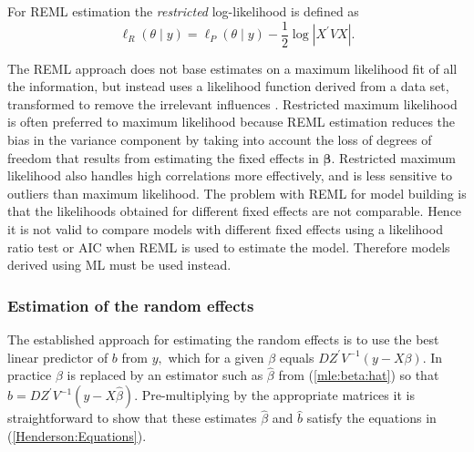 \documentclass[12pt, a4paper]{report}
\theoremstyle{plain}
\theoremstyle{definition}
\theoremstyle{remark}
\begin{document}
For REML estimation the \emph{restricted} log-likelihood is defined as
\[
\ell_R(\theta \mid y) =
\ell_P(\theta \mid y) -\frac{1}{2} \log |X^\prime VX |.
\]

The REML approach does not base estimates on a maximum likelihood fit of all the information, but instead uses a likelihood function derived from a data set, transformed to remove the irrelevant influences \citep{REMLDefine}.
Restricted maximum likelihood is often preferred to maximum likelihood because REML estimation reduces the bias in the variance component by taking into account the loss of degrees of freedom that results
from estimating the fixed effects in $\boldsymbol{\beta}$. Restricted maximum likelihood also handles high correlations more effectively, and is less sensitive to outliers than maximum likelihood.  The problem with REML for model building is that the likelihoods obtained for different fixed effects are not comparable. Hence it is not valid to compare models with different fixed effects using a likelihood ratio test or AIC when REML is used to
estimate the model. Therefore models derived using ML must be used instead.

\subsubsection{Estimation of the random effects}

The established approach for estimating the random effects is to use the best linear predictor of $b$ from $y,$ which for a given $\beta$ equals $DZ^\prime V^{-1}(y - X \beta).$ In practice $\beta$ is replaced by an estimator such as $\hat{\beta}$ from (\ref{mle:beta:hat}) so that $\hat{b} = DZ^\prime V^{-1}(y - X \hat{\beta}).$ Pre-multiplying by the appropriate matrices it is straightforward to show that these estimates $\hat{\beta}$ and $\hat{b}$ satisfy the equations in (\ref{Henderson:Equations}).
\end{document}
